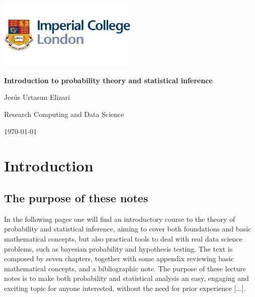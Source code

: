 \documentclass{book}
\begin{document}

\frontmatter

\begin{titlepage}
    \centering
    \includegraphics[width=0.5\textwidth]{figures/icl_logo.jpeg} 
    \vfill
    {\Huge\bfseries Introduction to probability theory and statistical inference\par}
    \vspace{1cm}
    {\Large Jes\'us Urtasun Elizari\par}
    \vspace{1cm}
     {\Large Research Computing and Data Science\par}
    \vspace{1cm}
    {\large\today\par}
    \vspace*{\fill}
\end{titlepage}

\tableofcontents

\clearpage
\printindex

\mainmatter



\chapter{Introduction}

\section{The purpose of these notes}

In the following pages one will find an introductory course to the theory of probability and statistical inference, aiming to cover both foundations and basic mathematical concepts, but also practical tools to deal with real data science problems, such as bayesian probability and hypothesis testing. The text is composed by seven chapters, together with some appendix reviewing basic mathematical concepts, and a bibliographic note. The purpose of these lecture notes is to make both probability and statistical analysis an easy, engaging and exciting topic for anyone interested, without the need for prior experience [...].\\
\end{document}

